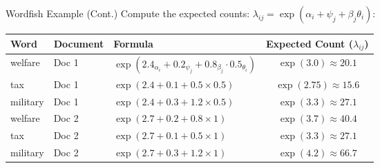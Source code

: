 \documentclass[
  ignorenonframetext,
  aspectratio=169]{beamer}
\begin{document}
\begin{frame}{Wordfish Example (Cont.)}
\label{wordfish-example-cont.-1}
Compute the expected counts:
\(\lambda_{ij} = \exp(\alpha_i + \psi_j + \beta_j\theta_i)\):

\par \vspace{2.5mm}

\begin{tabular}{lllc}
\toprule
Word & Document & Formula & Expected Count ($\lambda_{ij}$) \\
\midrule
welfare  & Doc 1 & $\exp(2.4_{\alpha_i} + 0.2_{\psi_j} + 0.8_{\beta_j}\cdot 0.5_{\theta_i})$ & $\exp(3.0) \approx 20.1$ \\
tax      & Doc 1 & $\exp(2.4 + 0.1 + 0.5 \times 0.5)$ & $\exp(2.75) \approx 15.6$ \\
military & Doc 1 & $\exp(2.4 + 0.3 + 1.2 \times 0.5)$ & $\exp(3.3) \approx 27.1$ \\
\addlinespace
welfare  & Doc 2 & $\exp(2.7 + 0.2 + 0.8 \times 1)$ & $\exp(3.7) \approx 40.4$ \\
tax      & Doc 2 & $\exp(2.7 + 0.1 + 0.5 \times 1)$ & $\exp(3.3) \approx 27.1$ \\
military & Doc 2 & $\exp(2.7 + 0.3 + 1.2 \times 1)$ & $\exp(4.2) \approx 66.7$ \\
\bottomrule
\end{tabular}
\end{frame}
\end{document}
